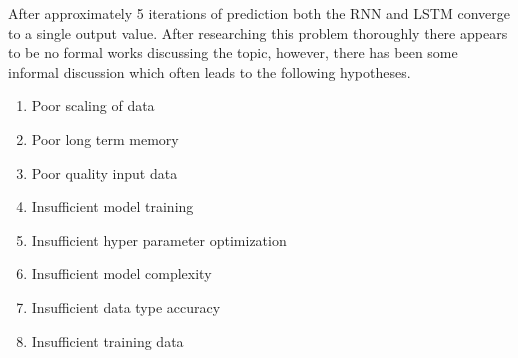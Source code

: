 \documentclass{article}
\begin{document}
After approximately 5 iterations of prediction both the RNN and LSTM converge to a single output value. After researching this problem thoroughly there appears to be no formal works discussing the topic, however, there has been some informal discussion which often leads to the following hypotheses.
\begin{enumerate}
\item Poor scaling of data
\item Poor long term memory
\item Poor quality input data
\item Insufficient model training
\item Insufficient hyper parameter optimization
\item Insufficient model complexity
\item Insufficient data type accuracy
\item Insufficient training data
\end{enumerate}

\pagebreak
\end{document}
